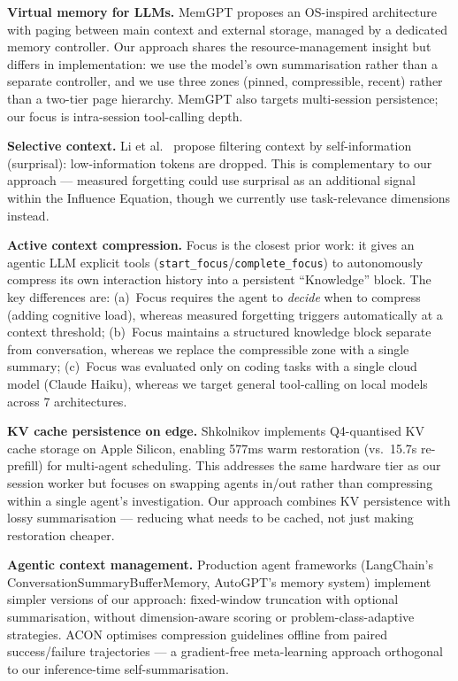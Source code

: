 \documentclass[11pt,a4paper]{article}
\begin{document}
\textbf{Virtual memory for LLMs.} MemGPT \cite{packer2023memgpt} proposes an OS-inspired architecture with paging between main context and external storage, managed by a dedicated memory controller. Our approach shares the resource-management insight but differs in implementation: we use the model's own summarisation rather than a separate controller, and we use three zones (pinned, compressible, recent) rather than a two-tier page hierarchy. MemGPT also targets multi-session persistence; our focus is intra-session tool-calling depth.

\textbf{Selective context.} Li et al.\ \cite{li2023selective} propose filtering context by self-information (surprisal): low-information tokens are dropped. This is complementary to our approach --- measured forgetting could use surprisal as an additional signal within the Influence Equation, though we currently use task-relevance dimensions instead.

\textbf{Active context compression.} Focus \cite{verma2026focus} is the closest prior work: it gives an agentic LLM explicit tools (\texttt{start\_focus}/\texttt{complete\_focus}) to autonomously compress its own interaction history into a persistent ``Knowledge'' block. The key differences are: (a)~Focus requires the agent to \emph{decide} when to compress (adding cognitive load), whereas measured forgetting triggers automatically at a context threshold; (b)~Focus maintains a structured knowledge block separate from conversation, whereas we replace the compressible zone with a single summary; (c)~Focus was evaluated only on coding tasks with a single cloud model (Claude Haiku), whereas we target general tool-calling on local models across 7 architectures.

\textbf{KV cache persistence on edge.} Shkolnikov \cite{shkolnikov2026kv} implements Q4-quantised KV cache storage on Apple Silicon, enabling 577ms warm restoration (vs.\ 15.7s re-prefill) for multi-agent scheduling. This addresses the same hardware tier as our session worker but focuses on swapping agents in/out rather than compressing within a single agent's investigation. Our approach combines KV persistence with lossy summarisation --- reducing what needs to be cached, not just making restoration cheaper.

\textbf{Agentic context management.} Production agent frameworks (LangChain's ConversationSummaryBufferMemory, AutoGPT's memory system) implement simpler versions of our approach: fixed-window truncation with optional summarisation, without dimension-aware scoring or problem-class-adaptive strategies. ACON \cite{kang2025acon} optimises compression guidelines offline from paired success/failure trajectories --- a gradient-free meta-learning approach orthogonal to our inference-time self-summarisation.
\end{document}
